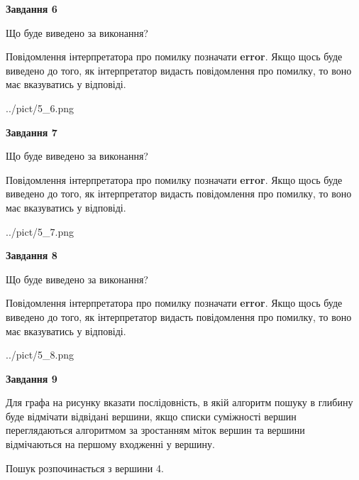\documentclass[12pt, ukrainian]{article}
\begin{document}
{\begin {large}
{\begin {center}\textbf{Завдання 6}\end {center}}\par
Що буде виведено за виконання?

Повідомлення інтерпретатора про помилку позначати \textbf{error}.
Якщо щось буде виведено до того, як інтерпретатор видасть повідомлення про помилку, 
то воно має вказуватись у відповіді. \par


\begin{center}
	{../pict/5_6.png}
\end{center}
\newpage

{\begin {center}\textbf{Завдання 7}\end {center}}\par
Що буде виведено за виконання?

Повідомлення інтерпретатора про помилку позначати \textbf{error}.
Якщо щось буде виведено до того, як інтерпретатор видасть повідомлення про помилку, 
то воно має вказуватись у відповіді. \par


\begin{center}
	{../pict/5_7.png}
\end{center}
\newpage

{\begin {center}\textbf{Завдання 8}\end {center}}\par
Що буде виведено за виконання?

Повідомлення інтерпретатора про помилку позначати \textbf{error}.
Якщо щось буде виведено до того, як інтерпретатор видасть повідомлення про помилку, 
то воно має вказуватись у відповіді. \par


\begin{center}
	{../pict/5_8.png}
\end{center}
\newpage

{\begin {center}\textbf{Завдання 9}\end {center}}\par
Для графа на рисунку вказати послідовність, в якій алгоритм пошуку в глибину буде відмічати відвідані вершини, якщо списки суміжності вершин переглядаються алгоритмом за зростанням міток вершин та вершини відмічаються на першому вход\-женні у вершину.\par
Пошук розпочинається з вершини 4.\par


\end{large}}
\end{document}
